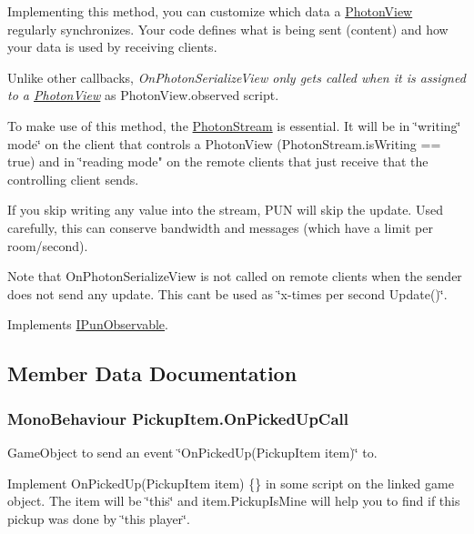 Implementing this method, you can customize which data a \hyperlink{class_photon_view}{Photon\+View} regularly synchronizes. Your code defines what is being sent (content) and how your data is used by receiving clients.

Unlike other callbacks, {\itshape On\+Photon\+Serialize\+View only gets called when it is assigned to a \hyperlink{class_photon_view}{Photon\+View}} as Photon\+View.\+observed script.

To make use of this method, the \hyperlink{class_photon_stream}{Photon\+Stream} is essential. It will be in \char`\"{}writing\char`\"{} mode\char`\"{} on the
client that controls a Photon\+View (\+Photon\+Stream.\+is\+Writing == true) and in \char`\"{}reading mode" on the remote clients that just receive that the controlling client sends.

If you skip writing any value into the stream, P\+UN will skip the update. Used carefully, this can conserve bandwidth and messages (which have a limit per room/second).

Note that On\+Photon\+Serialize\+View is not called on remote clients when the sender does not send any update. This can\textquotesingle{}t be used as \char`\"{}x-\/times per second Update()\char`\"{}. 

Implements \hyperlink{group__public_api_ga78c69bbb6f79d1e4fb23d3f761eaf4aa}{I\+Pun\+Observable}.



\subsection{Member Data Documentation}
\subsubsection[{\texorpdfstring{On\+Picked\+Up\+Call}{OnPickedUpCall}}]{\setlength{\rightskip}{0pt plus 5cm}Mono\+Behaviour Pickup\+Item.\+On\+Picked\+Up\+Call}\hypertarget{class_pickup_item_a48a1fe620e9fecb4e8825c48723140c4}{}\label{class_pickup_item_a48a1fe620e9fecb4e8825c48723140c4}


Game\+Object to send an event \char`\"{}\+On\+Picked\+Up(\+Pickup\+Item item)\char`\"{} to. 

Implement On\+Picked\+Up(\+Pickup\+Item item) \{\} in some script on the linked game object. The item will be \char`\"{}this\char`\"{} and item.\+Pickup\+Is\+Mine will help you to find if this pickup was done by \char`\"{}this player\char`\"{}. 
